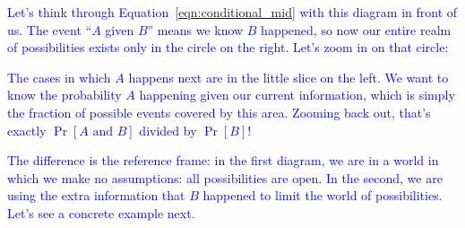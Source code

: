 \documentclass[12 pt]{article}
\newcommand{\new}[1]{\textcolor{blue}{#1}}
\newcounter{example}[section]
\begin{document}
\new{Let's think through Equation~\ref{eqn:conditional_mid} with this diagram 
in front of us. The event ``$A$ given $B$'' means we know $B$ happened, 
so now our entire realm of possibilities exists only in the circle 
on the right. Let's zoom in on that circle:} 

\begin{center}
\end{center}
\new{The cases in which $A$ happens next are in the little slice on the 
left. We want to know the probability $A$ happening given our current 
information, which is simply the fraction of possible events covered by 
this area. Zooming back out, that's exactly $\Pr[A \text{ and } B]$ 
divided by $\Pr[B]$!}

\new{The difference is the reference frame: in the first diagram, we are in a 
world in which we make no assumptions: all possibilities are open. In 
the second, we are using the extra information that $B$ happened to 
limit the world of possibilities. Let's see a concrete example next.}
\end{document}
